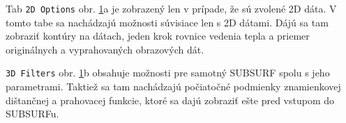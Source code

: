 \documentclass[a4paper,12pt,twoside]{article}%
\begin{document}
Tab \texttt{2D Options} obr. \ref{fig:uidata1}a je zobrazený len v prípade, že sú zvolené 2D dáta. V tomto tabe sa nachádzajú možnosti súvisiace len s 2D dátami. Dájú sa tam zobraziť kontúry na dátach,  jeden krok rovnice vedenia tepla a priemer originálnych a vyprahovaných obrazových dát. 

\texttt{3D Filters} obr. \ref{fig:uidata1}b obsahuje možnosti pre samotný SUBSURF spolu s jeho parametrami. Taktiež sa tam nachádzajú počiatočné podmienky znamienkovej dištančnej a prahovacej funkcie, ktoré sa dajú zobraziť ešte pred vstupom do SUBSURFu.


\begin{figure}[H]%
    \centering
    \qquad
    \caption{}%
    \label{fig:uidata1}%
\end{figure}
\end{document}
